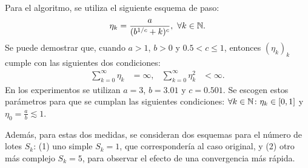 Para el algoritmo, se utiliza el siguiente esquema de paso:
\begin{equation}
    \eta_k = \frac{a}{(b^{1/c} + k)^c},\ \forall k \in \mathbb{N}.
\end{equation}
Se puede demostrar que, cuando $a > 1$, $b > 0$ y $0.5 < c \leq 1$, entonces $(\eta_k)_{k}$ cumple con las siguientes dos condiciones:
\begin{align}
    \sum_{k=0}^{\infty} \eta_k   & = \infty, &
    \sum_{k=0}^{\infty} \eta_k^2 & < \infty.
\end{align}
En los experimentos se utilizan $a = 3$, $b = 3.01$ y $c = 0.501$. Se escogen estos parámetros para que se cumplan las siguientes condiciones: $\forall k\in\mathbb{N} \colon \eta_k\in[0, 1]$ y $\eta_0 = \frac{a}{b} \lesssim 1$.

Además, para estas dos medidas, se consideran dos esquemas para el número de lotes $S_k$: (1) uno simple $S_k = 1$, que correspondería al caso original, y (2) otro más complejo $S_k = 5$, para observar el efecto de una convergencia más rápida.


